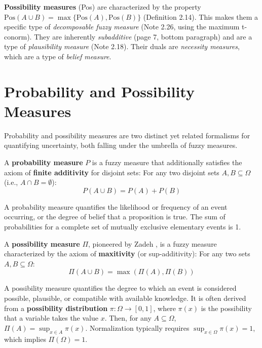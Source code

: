 \textbf{Possibility measures} (Pos) are characterized by the property $\text{Pos}(A \cup B) = \max\{\text{Pos}(A), \text{Pos}(B)\}$ (Definition 2.14). This makes them a specific type of \textit{decomposable fuzzy measure} (Note 2.26, using the maximum t-conorm). They are inherently \textit{subadditive} (page 7, bottom paragraph) and are a type of \textit{plausibility measure} (Note 2.18). Their duals are \textit{necessity measures}, which are a type of \textit{belief measure}.


\section{Probability and Possibility Measures}
Probability and possibility measures are two distinct yet related formalisms for quantifying uncertainty, both falling under the umbrella of fuzzy measures.

\begin{definition}
A \textbf{probability measure} $P$ is a fuzzy measure that additionally satisfies the axiom of \textbf{finite additivity} for disjoint sets:
For any two disjoint sets $A, B \subseteq \Omega$ (i.e., $A \cap B = \emptyset$):
\[ P(A \cup B) = P(A) + P(B) \]
\end{definition}
A probability measure quantifies the likelihood or frequency of an event occurring, or the degree of belief that a proposition is true. The sum of probabilities for a complete set of mutually exclusive elementary events is 1.

\begin{definition}
A \textbf{possibility measure} $\Pi$, pioneered by Zadeh \cite{Zadeh1978}, is a fuzzy measure characterized by the axiom of \textbf{maxitivity} (or sup-additivity):
For any two sets $A, B \subseteq \Omega$:
\[ \Pi(A \cup B) = \max(\Pi(A), \Pi(B)) \]
\end{definition}
A possibility measure quantifies the degree to which an event is considered possible, plausible, or compatible with available knowledge. It is often derived from a \textbf{possibility distribution} $\pi: \Omega \to [0, 1]$, where $\pi(x)$ is the possibility that a variable takes the value $x$. Then, for any $A \subseteq \Omega$, $\Pi(A) = \sup_{x \in A} \pi(x)$. Normalization typically requires $\sup_{x \in \Omega} \pi(x) = 1$, which implies $\Pi(\Omega) = 1$.

